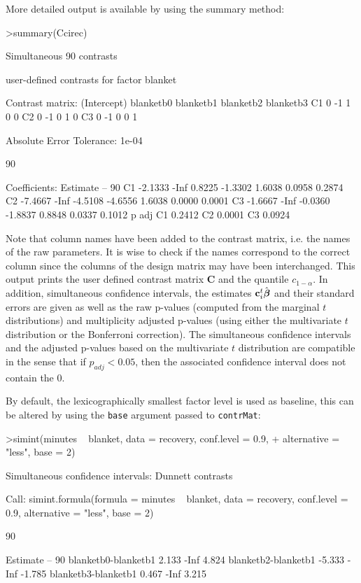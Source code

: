 \documentclass{article}
\newcommand{\bbeta}{\mbox{\boldmath $\beta$}}
\newcommand{\bc}{{\mathbf{c}}}
\newcommand{\bC}{{\mathbf{C}}}
\begin{document}
More detailed output is available by using the summary method:
\small
\begin{Schunk}
\begin{Sinput}
>summary(Ccirec)
\end{Sinput}
\begin{Soutput}
	Simultaneous 90% confidence intervals: user-defined
	contrasts

	 user-defined contrasts for factor blanket

Contrast matrix:
   (Intercept) blanketb0 blanketb1 blanketb2 blanketb3
C1           0        -1         1         0         0
C2           0        -1         0         1         0
C3           0        -1         0         0         1

Absolute Error Tolerance:  1e-04 

 90 % quantile:  1.8431 

Coefficients:
   Estimate   --    90 % t value Std.Err.  p raw p Bonf
C1  -2.1333 -Inf  0.8225 -1.3302   1.6038 0.0958 0.2874
C2  -7.4667 -Inf -4.5108 -4.6556   1.6038 0.0000 0.0001
C3  -1.6667 -Inf -0.0360 -1.8837   0.8848 0.0337 0.1012
    p adj
C1 0.2412
C2 0.0001
C3 0.0924
\end{Soutput}
\end{Schunk}
Note that column names have been added to the contrast matrix, i.e. the
names of the raw parameters. It is wise to check if the names correspond to
the correct column since the columns of the design matrix may have been
interchanged. 
\normalsize
This output prints the user defined contrast matrix $\bC$ 
and the quantile $c_{1-\alpha}$. In addition,
simultaneous confidence intervals, the estimates $\bc_i^t
\hat{\bbeta}$ and their standard errors are given as well as the raw
p-values (computed from the marginal $t$ distributions) and
multiplicity adjusted p-values (using either the multivariate $t$ distribution or
the Bonferroni correction). The simultaneous confidence intervals
and the adjusted p-values based on the multivariate $t$ distribution are compatible in
the sense that if $p_{adj}<0.05$, then the associated confidence
interval does not contain the 0.

By default, the lexicographically smallest factor level is used as baseline,
this can be altered by using the \texttt{base} argument passed to
\texttt{contrMat}:
\small
\begin{Schunk}
\begin{Sinput}
>simint(minutes ~ blanket, data = recovery, conf.level = 0.9, 
+     alternative = "less", base = 2)
\end{Sinput}
\begin{Soutput}
	Simultaneous confidence intervals: Dunnett
	contrasts

Call: 
simint.formula(formula = minutes ~ blanket, data = recovery, 
    conf.level = 0.9, alternative = "less", base = 2)

	90 % confidence intervals

                    Estimate   --   90 %
blanketb0-blanketb1    2.133 -Inf  4.824
blanketb2-blanketb1   -5.333 -Inf -1.785
blanketb3-blanketb1    0.467 -Inf  3.215
\end{Soutput}
\end{Schunk}
\normalsize
\end{document}
